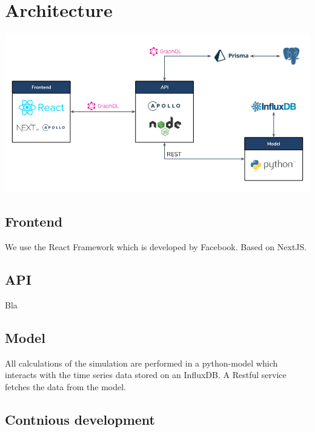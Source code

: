 \section{Architecture}

\begin{center}
  \includegraphics[scale=0.45]{img/architecture.png}
\end{center}

\subsection{Frontend}
We use the React Framework which is developed by Facebook. Based on NextJS.

\subsection{API}
Bla


\subsection{Model}
All calculations of the simulation are performed in a python-model which interacts with the time series data stored on an InfluxDB. A Restful service fetches the data from the model.

\subsection{Contnious development}

